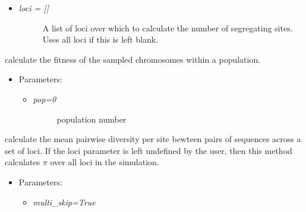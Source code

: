 \documentclass[letterpaper,10pt,english]{sphinxmanual}
\begin{document}
\begin{fulllineitems}
\begin{fulllineitems}
\begin{itemize}
\begin{itemize}
\begin{description}
\end{description}

\item {} \begin{description}
\item[{\emph{loci = {[}{]}}}] \leavevmode
A list of loci over which to calculate the number of segregating
sites.  Uses all loci if this is left blank.

\end{description}

\end{itemize}

\end{itemize}

\end{fulllineitems}


\begin{fulllineitems}
\label{index:sfs.Simulation.calc_fit}
calculate the fitness of the sampled chromosomes
within a population.
\begin{itemize}
\item {} 
Parameters:
\begin{itemize}
\item {} \begin{description}
\item[{\emph{pop=0} }] \leavevmode
population number

\end{description}

\end{itemize}

\end{itemize}

\end{fulllineitems}


\begin{fulllineitems}
\label{index:sfs.Simulation.calc_pi}
calculate the mean pairwise diversity per site
bewteen pairs of sequences across a set of loci.
If the loci parameter is left undefined by the
user, then this method calculates \(\pi\) 
over all loci in the simulation.
\begin{itemize}
\item {} 
Parameters:
\begin{itemize}
\item {} 
\emph{multi\_skip=True}
\begin{quote}


\end{quote}
\end{itemize}
\end{itemize}
\end{fulllineitems}
\end{fulllineitems}
\end{document}
